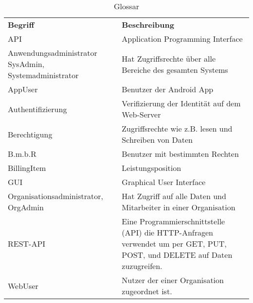 
\begin{table}[h]
	\centering
	\begin{tabularx}{\textwidth}{X X}
		\rowcolor[HTML]{C0C0C0} 
		\textbf{Begriff} & \textbf{Beschreibung} \\
		API & Application Programming Interface\\

		\rowcolor[HTML]{E7E7E7} 
		Anwendungsadministrator SysAdmin, Systemadministrator  & Hat Zugriffsrechte über alle Bereiche des gesamten Systems \\
		AppUser & Benutzer der Android App \\

		\rowcolor[HTML]{E7E7E7} 		
		Authentifizierung & Verifizierung der Identität auf dem Web-Server \\
		Berechtigung & Zugriffsrechte wie z.B. lesen und Schreiben von Daten \\
		\rowcolor[HTML]{E7E7E7} 
		B.m.b.R & Benutzer mit bestimmten Rechten \\
		BillingItem & Leistungsposition \\
				\rowcolor[HTML]{E7E7E7} 
		GUI & Graphical User Interface \\



		\rowcolor[HTML]{E7E7E7} 
		Organisationsadministrator, OrgAdmin & Hat Zugriff auf alle Daten und Mitarbeiter in einer Organisation \\
		

		REST-API & Eine Programmierschnittstelle (API) die HTTP-Anfragen verwendet um per GET, PUT, POST, und DELETE auf Daten zuzugreifen.\\
		\rowcolor[HTML]{E7E7E7} 
		WebUser & Nutzer der einer Organisation zugeordnet ist. \\
		
	

	\end{tabularx}
	\caption{Glossar}
	\label{table:glossar}
\end{table}